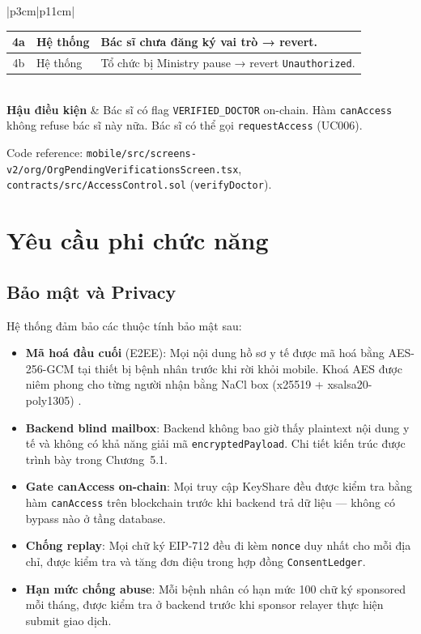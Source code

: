 \documentclass[../DoAn]{subfiles}
\begin{document}
\begin{table}[H]
\begin{tabular}{|p{3cm}|p{11cm}|}
\begin{tabular}{|c|p{2.3cm}|p{6cm}|}
4a & Hệ thống & Bác sĩ chưa đăng ký vai trò → revert. \\ \hline
4b & Hệ thống & Tổ chức bị Ministry pause → revert \texttt{Unauthorized}. \\ \hline
\end{tabular} \\ \hline
\textbf{Hậu điều kiện} & Bác sĩ có flag \texttt{VERIFIED\_DOCTOR} on-chain. Hàm \texttt{canAccess} không refuse bác sĩ này nữa. Bác sĩ có thể gọi \texttt{requestAccess} (UC006). \\ \hline
\end{tabular}
\end{table}

Code reference: \texttt{mobile/src/screens-v2/org/OrgPendingVerificationsScreen.tsx}, \texttt{contracts/src/AccessControl.sol} (\texttt{verifyDoctor}).

\section{Yêu cầu phi chức năng}

\subsection{Bảo mật và Privacy}

Hệ thống đảm bảo các thuộc tính bảo mật sau:

\begin{itemize}
    \item \textbf{Mã hoá đầu cuối} (E2EE): Mọi nội dung hồ sơ y tế được mã hoá bằng AES-256-GCM \cite{nist2007aesgcm} tại thiết bị bệnh nhân trước khi rời khỏi mobile. Khoá AES được niêm phong cho từng người nhận bằng NaCl box (x25519 + xsalsa20-poly1305) \cite{bernstein2009nacl}.
    \item \textbf{Backend blind mailbox}: Backend không bao giờ thấy plaintext nội dung y tế và không có khả năng giải mã \texttt{encryptedPayload}. Chi tiết kiến trúc được trình bày trong Chương~5.1.
    \item \textbf{Gate canAccess on-chain}: Mọi truy cập KeyShare đều được kiểm tra bằng hàm \texttt{canAccess} trên blockchain trước khi backend trả dữ liệu --- không có bypass nào ở tầng database.
    \item \textbf{Chống replay}: Mọi chữ ký EIP-712 \cite{eip712} đều đi kèm \texttt{nonce} duy nhất cho mỗi địa chỉ, được kiểm tra và tăng đơn điệu trong hợp đồng \texttt{ConsentLedger}.
    \item \textbf{Hạn mức chống abuse}: Mỗi bệnh nhân có hạn mức 100 chữ ký sponsored mỗi tháng, được kiểm tra ở backend trước khi sponsor relayer thực hiện submit giao dịch.
\end{itemize}
\end{document}
